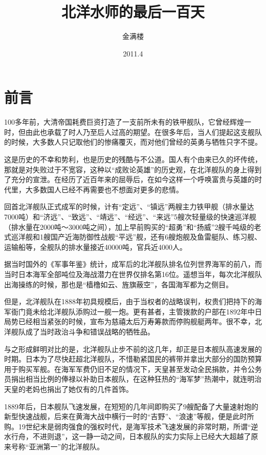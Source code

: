 \documentclass[12pt,UTF8]{ctexbook}
\title{\heiti\zihao{0} 北洋水师的最后一百天}
\author{金满楼}
\date{2011.4}
\begin{document}
\maketitle
\tableofcontents

\frontmatter

\chapter{前言}

100多年前，大清帝国耗费巨资打造了一支前所未有的铁甲舰队，它曾经辉煌一时，但由此也承载了时人乃至后人过高的期望。在很多年后，当人们提起这支舰队的时候，大多数人只记取他们的惨痛覆灭，而对他们曾经的英勇与牺牲只字不提。

这是历史的不幸和势利，也是历史的残酷与不公道。国人有个由来已久的坏传统，那就是对失败过于不宽容，这种以“成败论英雄”的历史观，在北洋舰队的身上得到了充分的宣泄。在经历了近百年来的屈辱后，在如今这样一个呼唤富贵与英雄的时代里，大多数国人已经不再需要也不想面对更多的悲情。

回首北洋舰队正式成军的时候，计有“定远”、“镇远”两艘主力铁甲舰（排水量达7000吨）和“济远”、“致远”、“靖远”、“经远”、“来远”5艘次轻量级的快速巡洋舰（排水量在2000吨～3000吨之间），加上早前购买的“超勇”和“扬威”2艘千吨级的老式巡洋舰和1艘国产近海防御性战舰“平远”舰，还有6艘炮舰及鱼雷艇队、练习舰、运输船等，全舰队的排水量接近40000吨，官兵近4000人。

据当时国外的《军事年鉴》统计，成军后的北洋舰队排名位列世界海军的前八，而当时日本海军全部吨位及海战潜力在世界仅排名第16位。遥想当年，每次北洋舰队出海操练的时候，那也是“樯橹如云、旌旗蔽空”，各国海军都为之侧目。

但是，北洋舰队在1888年初具规模后，由于当权者的战略误判，权贵们把持下的海军衙门竟未给北洋舰队添购过一舰一炮。更有甚者，主管拨款的户部在1892年中日局势已经相当紧张的时候，宣布为慈禧太后万寿筹款而停购舰艇两年。很不幸，北洋舰队成了当时政治斗争和错误战略的牺牲品。

与之形成鲜明对比的是，北洋舰队止步不前的这几年，却正是日本舰队高速发展的时期。日本为了尽快赶超北洋舰队，不惜勒紧国民的裤带并拿出大部分的国防预算用于购买军舰。在海军军费仍旧不足的情况下，天皇甚至发动全民捐款，并令公务员捐出相当比例的俸禄以补助日本舰队，在这种狂热的“海军梦”热潮中，就连明治天皇的老妈也捐出了她仅有的几件首饰。

1889年后，日本舰队飞速发展，在短短的几年间即购买了9艘配备了大量速射炮的新型快速战舰，后来在黄海大战中横行一时的“吉野”、“浪速”等舰，便是此时所购。19世纪末是弱肉强食的强权时代，是海军技术飞速发展的非常时期，所谓“逆水行舟，不进则退”，这一静一动之间，日本舰队的实力实际上已经大大超越了原来号称“亚洲第一”的北洋舰队。
\end{document}
